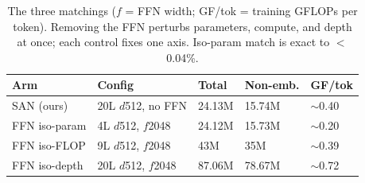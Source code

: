 \begin{table}[t]\centering\footnotesize
\setlength{\tabcolsep}{3.5pt}
\begin{tabular}{@{}lllll@{}}
\toprule
Arm & Config & Total & Non-emb. & GF/tok \\
\midrule
SAN (ours) & 20L $d$512, no FFN & 24.13M & 15.74M & $\sim$0.40 \\
FFN iso-param & 4L $d$512, $f$2048 & 24.12M & 15.73M & $\sim$0.20 \\
FFN iso-FLOP & 9L $d$512, $f$2048 & 43M & 35M & $\sim$0.39 \\
FFN iso-depth & 20L $d$512, $f$2048 & 87.06M & 78.67M & $\sim$0.72 \\
\bottomrule
\end{tabular}
\caption{The three matchings ($f$ = FFN width; GF/tok = training GFLOPs
per token). Removing the FFN perturbs parameters, compute, and depth at
once; each control fixes one axis. Iso-param match is exact to $<$0.04\%.}
\label{tab:configs}
\end{table}

